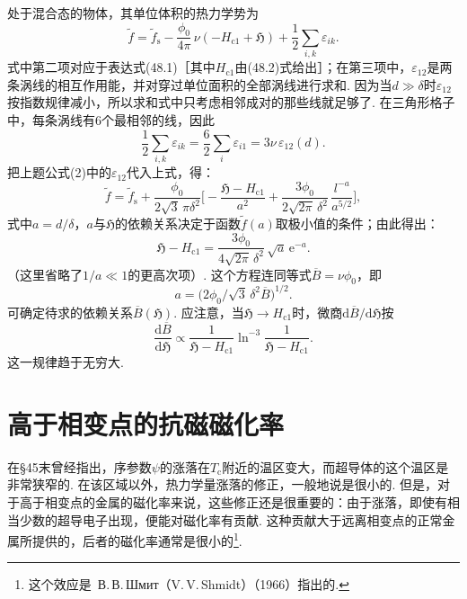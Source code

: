 \begin{xiti}
处于混合态的物体，其单位体积的热力学势为
\begin{equation*}
\tilde{f}=\tilde{f}_{\mathrm{s}}-\frac{\phi_0}{4\pi}\,\nu(-H_{\mathrm{c}1}+\mathfrak{H})
+\frac{1}{2}\sum_{i,k}\varepsilon_{ik}.
\end{equation*}
式中第二项对应于表达式(48.1)［其中$H_{\mathrm{c}1}$由(48.2)式给出］；在第三项中，$\varepsilon_{12}$是两条涡线的相互作用能，并对穿过单位面积的全部涡线进行求和. 因为当$d\gg\delta$时$\varepsilon_{12}$按指数规律减小，所以求和式中只考虑相邻成对的那些线就足够了. 在三角形格子中，每条涡线有6个最相邻的线，因此
\begin{equation*}
\frac{1}{2}\sum_{i,k}\varepsilon_{ik}=\frac{6}{2}\sum_i\varepsilon_{i1}=3\nu\,\varepsilon_{12}(d).
\end{equation*}
把上题公式(2)中的$\varepsilon_{12}$代入上式，得：
\begin{equation*}
\tilde{f}=\tilde{f}_{\mathrm{s}}+\frac{\phi_0}{2\sqrt{3}\,\pi\delta^2}
\biggl[-\frac{\mathfrak{H}-H_{\mathrm{c}1}}{a^2}
+\frac{3\phi_0}{2\sqrt{2\pi}\,\delta^2}\,\frac{l^{-a}}{a^{5/2}}\biggr],
\end{equation*}
式中$a=d/\delta$，$a$与$\mathfrak{H}$的依赖关系决定于函数$\tilde{f}(a)$取极小值的条件；由此得出：
\begin{equation}\tag{3}
\mathfrak{H}-H_{\mathrm{c}1}=\frac{3\phi_0}{4\sqrt{2\pi}\,\delta^2}\,\sqrt{a}\,\mathrm{e}^{-a}.
\end{equation}
（这里省略了$1/a\ll1$的更高次项）. 这个方程连同等式$\overline{B}=\nu\phi_0$，即
\begin{equation*}
a=\bigl(2\phi_0/\sqrt{3}\,\delta^2\overline{B}\bigr)^{1/2}.
\end{equation*}
可确定待求的依赖关系$\overline{B}(\mathfrak{H})$. 应注意，当$\mathfrak{H}\to H_{\mathrm{c}1}$时，微商$\mathrm{d}\overline{B}/\mathrm{d}\mathfrak{H}$按
\begin{equation*}
\frac{\mathrm{d}\overline{B}}{\mathrm{d}\mathfrak{H}}
\propto\frac{1}{\mathfrak{H}-H_{\mathrm{c}1}}\ln^{-3}\frac{1}{\mathfrak{H}-H_{\mathrm{c}1}}.
\end{equation*}
这一规律趋于无穷大.

\end{xiti}

\section{高于相变点的抗磁磁化率}

在§45末曾经指出，序参数$\psi$的涨落在$T_{\mathrm{c}}$附近的温区变大，而超导体的这个温区是非常狭窄的. 在该区域以外，热力学量涨落的修正，一般地说是很小的. 但是，对于高于相变点的金属的磁化率来说，这些修正还是很重要的：由于涨落，即使有相当少数的超导电子出现，便能对磁化率有贡献. 这种贡献大于远离相变点的正常金属所提供的，后者的磁化率通常是很小的\footnote{这个效应是~В.\,В.\,Шмит（V.\,V.\,Shmidt）（1966）指出的.}.

